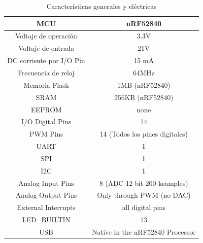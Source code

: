 \begin{table}[H]
\centering
\begin{tabular}{|c|c|}
\hline
MCU                      & nRF52840             \\ \hline
Voltaje de operación     & 3.3V                             \\ \hline
Voltaje de entrada       & 21V                              \\ \hline
DC corriente por I/O Pin & 15 mA                            \\ \hline
Frecuencia de reloj      & 64MHz                            \\ \hline
Memoria Flash            & 1MB (nRF52840)                   \\ \hline
SRAM                     & 256KB (nRF52840)                 \\ \hline
EEPROM                   & none                             \\ \hline
I/O Digital Pins         & 14                               \\ \hline
PWM Pins                 & 14 (Todos los pines digitales)   \\ \hline
UART                     & 1                                \\ \hline
SPI                      & 1                                \\ \hline
I2C                      & 1                                \\ \hline
Analog Input Pins        & 8 (ADC 12 bit 200 ksamples)      \\ \hline
Analog Output Pins       & Only through PWM (no DAC)        \\ \hline
External Interrupts      & all digital pins                 \\ \hline
LED\_BUILTIN             & 13                               \\ \hline
USB                      & Native in the nRF52840 Processor \\ \hline

\end{tabular}
\caption{Características generales y eléctricas}
\label{t1}
\end{table}




